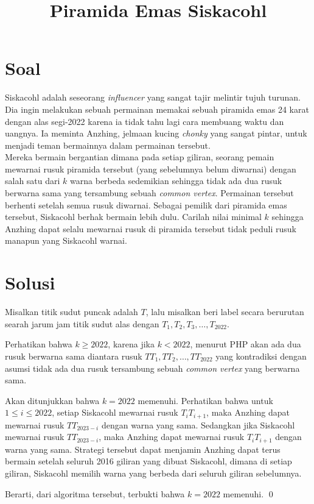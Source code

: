 \documentclass[a4paper, 12pt]{scrartcl}
\title{Piramida Emas Siskacohl}
\author{}
\date{}
\begin{document}
\maketitle
\vspace{-3cm}
\section{Soal}
Siskacohl adalah seseorang \textit{influencer} yang sangat tajir melintir tujuh turunan. Dia ingin melakukan sebuah permainan memakai sebuah piramida emas 24 karat dengan alas segi-2022 karena ia tidak tahu lagi cara membuang waktu dan uangnya. Ia meminta Anzhing, jelmaan kucing \textit{chonky} yang sangat pintar, untuk menjadi teman bermainnya dalam permainan tersebut.
\vspace{0.2cm}
\\Mereka bermain bergantian dimana pada setiap giliran, seorang pemain mewarnai rusuk piramida tersebut (yang sebelumnya belum diwarnai) dengan salah satu dari $k$ warna berbeda sedemikian sehingga tidak ada dua rusuk berwarna sama yang tersambung sebuah \textit{common vertex}. Permainan tersebut berhenti setelah semua rusuk diwarnai. Sebagai pemilik dari piramida emas tersebut, Siskacohl berhak bermain lebih dulu. Carilah nilai minimal $k$ sehingga Anzhing dapat selalu mewarnai rusuk di piramida tersebut tidak peduli rusuk manapun yang Siskacohl warnai.

\newpage
\section{Solusi}

Misalkan titik sudut puncak adalah $T$, lalu misalkan beri label secara berurutan searah jarum jam titik sudut alas dengan $T_1,T_2,T_3,\dots,T_{2022}$.

\vspace{0.2cm}
Perhatikan bahwa $k \ge 2022$, karena jika $k < 2022$, menurut PHP akan ada dua rusuk berwarna sama diantara rusuk $TT_1,TT_2,\dots,TT_{2022}$ yang kontradiksi dengan asumsi tidak ada dua rusuk tersambung sebuah \textit{common vertex} yang berwarna sama.

\vspace{0.2cm}
Akan ditunjukkan bahwa $k = 2022$ memenuhi. Perhatikan bahwa untuk $1 \le i \le 2022$, setiap Siskacohl mewarnai rusuk $T_{i}T_{i+1}$, maka Anzhing dapat mewarnai rusuk $TT_{2023-i}$ dengan warna yang sama. Sedangkan jika Siskacohl mewarnai rusuk $TT_{2023-i}$, maka Anzhing dapat mewarnai rusuk $T_{i}T_{i+1}$ dengan warna yang sama. Strategi tersebut dapat menjamin Anzhing dapat terus bermain setelah seluruh 2016 giliran yang dibuat Siskacohl, dimana di setiap giliran, Siskacohl memilih warna yang berbeda dari seluruh giliran sebelumnya.

\vspace{0.2cm}
Berarti, dari algoritma tersebut, terbukti bahwa $k=2022$ memenuhi. \qed
\end{document}
